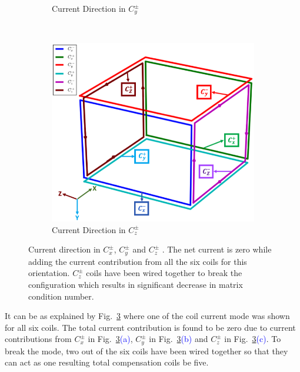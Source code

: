\begin{figure}
\begin{subfigure}{.5\linewidth}
        \caption{Current Direction in $C_y^{\pm}$}
        \label{fig:c3}
    \end{subfigure}\\[1ex]
    \begin{subfigure}{\linewidth}
        \centering
        \includegraphics[scale=.33]{Images/c5}
        \caption{Current Direction in $C_z^{\pm}$}
        \label{fig:c5}
    \end{subfigure}
    \caption[short]{Current direction in $C_x^{\pm}$, $C_y^{\pm}$ and $C_z^{\pm}$ . The net current is zero while adding the current contribution from all the six coils for this orientation. $C_z^{\pm}$ coils have been wired together to break the configuration which results in significant decrease in matrix condition number. }
    \label{fig:cDir}
\end{figure}


It can be as explained by Fig.~\ref{fig:cDir} where one of the coil current mode was shown for all six coils. The total current contribution is found to be zero due to current contributions from $C_x^{\pm}$ in Fig.~\ref{fig:cDir}\textcolor{blue}{(a)}, $C_y^{\pm}$ in Fig.~\ref{fig:cDir}\textcolor{blue}{(b)} and $C_z^{\pm}$ in Fig.~\ref{fig:cDir}\textcolor{blue}{(c)}. To break the mode, two out of the six coils have been wired together so that they can act as one resulting total compensation coils be five. 


